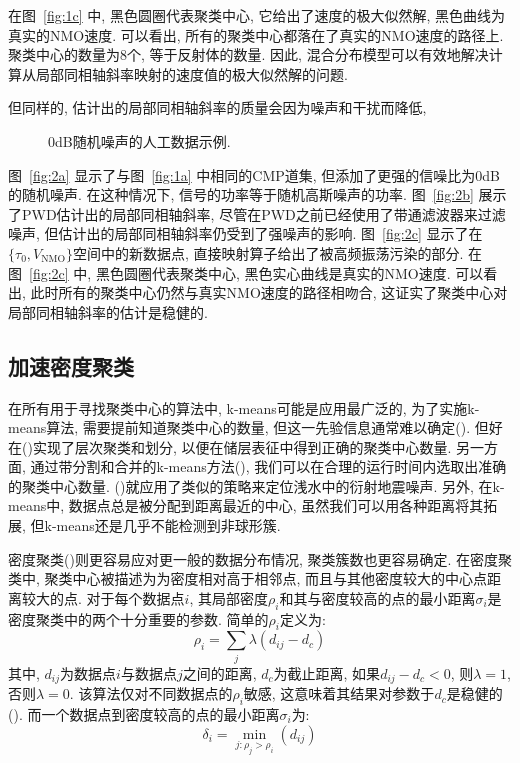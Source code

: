 在图~\ref{fig:1c} 中, 黑色圆圈代表聚类中心, 它给出了速度的极大似然解, 黑色曲线为真实的NMO速度. 可以看出, 所有的聚类中心都落在了真实的NMO速度的路径上. 聚类中心的数量为8个, 等于反射体的数量. 因此, 混合分布模型可以有效地解决计算从局部同相轴斜率映射的速度值的极大似然解的问题. 

但同样的, 估计出的局部同相轴斜率的质量会因为噪声和干扰而降低, 
\begin{figure}[htb]
    \centering
    \caption{0dB随机噪声的人工数据示例. }
\end{figure}
图~\ref{fig:2a} 显示了与图~\ref{fig:1a} 中相同的CMP道集, 但添加了更强的信噪比为0dB的随机噪声. 在这种情况下, 信号的功率等于随机高斯噪声的功率. 图~\ref{fig:2b} 展示了PWD估计出的局部同相轴斜率, 尽管在PWD之前已经使用了带通滤波器来过滤噪声, 但估计出的局部同相轴斜率仍受到了强噪声的影响. 图~\ref{fig:2c} 显示了在$\{\tau_0,V_{\mathrm{NMO}}\}$空间中的新数据点, 直接映射算子给出了被高频振荡污染的部分. 在图~\ref{fig:2c} 中, 黑色圆圈代表聚类中心, 黑色实心曲线是真实的NMO速度. 可以看出, 此时所有的聚类中心仍然与真实NMO速度的路径相吻合, 这证实了聚类中心对局部同相轴斜率的估计是稳健的. 
\subsection{加速密度聚类}
在所有用于寻找聚类中心的算法中, k-means可能是应用最广泛的, 为了实施k-means算法, 需要提前知道聚类中心的数量, 但这一先验信息通常难以确定(\cite{Hamerly2004}). 但好在\citeauthor{Wang2012}(\citeyear{Wang2012})实现了层次聚类和划分, 以便在储层表征中得到正确的聚类中心数量. 另一方面, 通过带分割和合并的k-means方法(\cite{Muhr2009}), 我们可以在合理的运行时间内选取出准确的聚类中心数量. \citeauthor{Lu2014}(\citeyear{Lu2014})就应用了类似的策略来定位浅水中的衍射地震噪声. 另外, 在k-means中, 数据点总是被分配到距离最近的中心, 虽然我们可以用各种距离将其拓展, 但k-means还是几乎不能检测到非球形簇. 

密度聚类(\cite{Rodriguez2014})则更容易应对更一般的数据分布情况, 聚类簇数也更容易确定. 在密度聚类中, 聚类中心被描述为为密度相对高于相邻点, 而且与其他密度较大的中心点距离较大的点. 对于每个数据点$i$, 其局部密度$\rho_i$和其与密度较高的点的最小距离$\sigma_i$是密度聚类中的两个十分重要的参数. 简单的$\rho_i$定义为:
\begin{equation}
    \rho_{i}=\sum_{j} \lambda\left(d_{i j}-d_{c}\right)
\end{equation}
其中, $d_{ij}$为数据点$i$与数据点$j$之间的距离, $d_c$为截止距离, 如果$d_{ij}-d_c<0$, 则$λ = 1$, 否则$λ = 0$. 该算法仅对不同数据点的$\rho_i$敏感, 这意味着其结果对参数于$d_c$是稳健的(\cite{Rodriguez2014}). 而一个数据点到密度较高的点的最小距离$\sigma_i$为: 
\begin{equation}
    \delta_{i}=\min _{j: \rho_{j}>\rho_{i}}\left(d_{i j}\right)
\end{equation}

